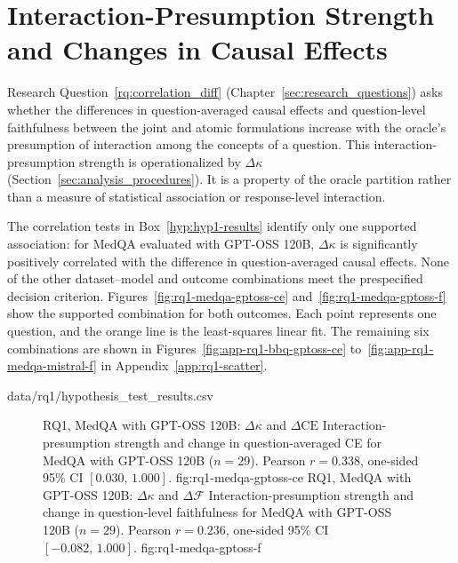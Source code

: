 \section{Interaction-Presumption Strength and Changes in Causal Effects}
\label{sec:results-interaction-presumption}
Research Question~\ref{rq:correlation_diff} (Chapter~\ref{sec:research_questions}) asks whether the differences in question-averaged causal effects and question-level faithfulness between the joint and atomic formulations increase with the oracle's presumption of interaction among the concepts of a question. This interaction-presumption strength is operationalized by $\Delta\kappa$ (Section~\ref{sec:analysis_procedures}). It is a property of the oracle partition rather than a measure of statistical association or response-level interaction.

The correlation tests in Box~\ref{hyp:hyp1-results} identify only one supported association: for MedQA evaluated with GPT-OSS 120B, $\Delta\kappa$ is significantly positively correlated with the difference in question-averaged causal effects. None of the other dataset--model and outcome combinations meet the prespecified decision criterion. Figures~\ref{fig:rq1-medqa-gptoss-ce} and~\ref{fig:rq1-medqa-gptoss-f} show the supported combination for both outcomes. Each point represents one question, and the orange line is the least-squares linear fit. The remaining six combinations are shown in Figures~\ref{fig:app-rq1-bbq-gptoss-ce} to~\ref{fig:app-rq1-medqa-mistral-f} in Appendix~\ref{app:rq1-scatter}.

  {data/rq1/hypothesis_test_results.csv}

\begin{figure}[htb]
  \centering
    {RQ1, MedQA with GPT-OSS 120B: $\Delta\kappa$ and $\Delta\mathrm{CE}$}%
    {Interaction-presumption strength and change in question-averaged CE for MedQA with GPT-OSS 120B ($n=29$). Pearson $r=0.338$, one-sided 95\% CI $[0.030,\,1.000]$.}%
    {fig:rq1-medqa-gptoss-ce}%
  \hfill
    {RQ1, MedQA with GPT-OSS 120B: $\Delta\kappa$ and $\Delta\mathcal{F}$}%
    {Interaction-presumption strength and change in question-level faithfulness for MedQA with GPT-OSS 120B ($n=29$). Pearson $r=0.236$, one-sided 95\% CI $[-0.082,\,1.000]$.}%
    {fig:rq1-medqa-gptoss-f}%
\end{figure}

